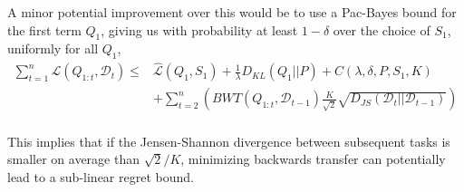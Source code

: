 \documentclass[letterpaper]{article}
\theoremstyle{definition}
\begin{document}
A minor potential improvement over this would be to use a Pac-Bayes bound for the first term $Q_1$, giving us with probability at least $1-\delta$ over the choice of $S_1$, uniformly for all $Q_1$,
\begin{equation}
\begin{split}
\sum_{t=1}^{n}\mathcal{L}(Q_{1:t}, \mathcal{D}_t) \leq &  \hat{\mathcal{L}}(Q_1, S_1)+\frac{1}{\lambda}D_{KL}(Q_1||P)+C(\lambda,\delta,P,S_1, K) \\ &+ \sum_{t=2}^{n}\left ( BWT(Q_{1:t}, \mathcal{D}_{t-1}) \frac{K}{\sqrt{2}}\sqrt{D_{JS}(\mathcal{D}_{t}||\mathcal{D}_{t-1})}\right ) \\&
\end{split}
\end{equation}

This implies that if the Jensen-Shannon divergence between subsequent tasks is smaller on average than $\sqrt{2}/K$, minimizing backwards transfer can potentially lead to a sub-linear regret bound.

\clearpage


\end{document}
